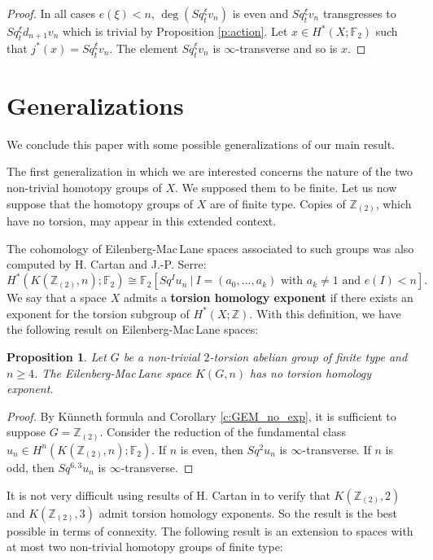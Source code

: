 \documentclass{conm-p-l}
\newtheorem{prop}[thm]{Proposition}
\theoremstyle{definition}
\newcommand{\Z}{\mathbb{Z}}
\newcommand{\F}{\mathbb{F}}
\renewcommand{\geq}{\geqslant}
\begin{document}
\begin{proof}
In all cases $e(\xi)<n$, $\deg(Sq^\xi_t v_n)$ is even and $Sq_{t}^\xi v_n$ transgresses to $Sq_t^\xi d_{n+1}v_n$ which is trivial by Proposition \ref{p:action}. Let $x\in H^*(X;\F_2)$ such that $j^*(x)=Sq_t^\xi v_n$. The element $Sq_t^\xi v_n$ is $\infty$-transverse and so is $x$.
\end{proof}

\section{Generalizations}\label{s:generalizations}

We conclude this paper with some possible generalizations of our main result.

The first generalization in which we are interested concerns the nature of the two non-trivial homotopy groups of $X$. We supposed them to be finite. Let us now suppose that the homotopy groups of $X$ are of finite type. Copies of $\Z_{(2)}$, which have no torsion, may appear in this extended context. 

The cohomology of Eilenberg-Mac\,Lane spaces associated to such groups was also computed by H. Cartan and J.-P. Serre:
$$
H^*(K(\Z_{(2)},n);\F_2)\cong\F_2[Sq^Iu_n\ |\ \text{$I=(a_0,...,a_k)$ with $a_k\not=1$ and $e(I)<n$}].
$$
We say that a space $X$ admits a {\bf torsion homology exponent} if there exists an exponent for the torsion subgroup of $H^*(X;\Z)$. With this definition, we have the following result on Eilenberg-Mac\,Lane spaces:

\begin{prop}
Let $G$ be a non-trivial $2$-torsion abelian group of finite type and $n\geq4$. The Eilenberg-Mac\,Lane space $K(G,n)$ has no torsion homology exponent.
\end{prop}

\begin{proof}
By K\"unneth formula and Corollary \ref{c:GEM_no_exp}, it is sufficient to suppose $G=\Z_{(2)}$. Consider the reduction of the fundamental class $u_n\in H^n(K(\Z_{(2)},n);\F_2)$. If $n$ is even, then $Sq^{2}u_n$ is $\infty$-transverse. If $n$ is odd, then $Sq^{6,3}u_n$ is $\infty$-transverse. 
\end{proof}

It is not very difficult using results of H. Cartan in \cite{Ca55} to verify that $K(\Z_{(2)},2)$ and $K(\Z_{(2)},3)$ admit torsion homology exponents. So the result is the best possible in terms of connexity. The following result is an extension to spaces with at most two non-trivial homotopy groups of finite type:
\end{document}
